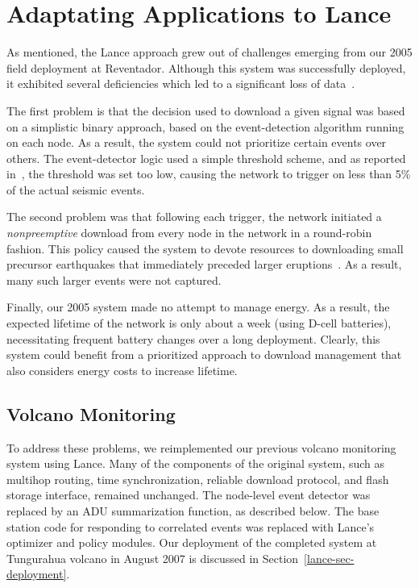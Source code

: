 \section{Adaptating Applications to Lance}
\label{lance-sec-adaptation}

As mentioned, the Lance approach grew out of challenges emerging from our
2005 field deployment at Reventador. Although this system was successfully
deployed, it exhibited several deficiencies which led to a significant loss
of data~\cite{volcano-osdi06}.

The first problem is that the decision used to download a given signal was
based on a simplistic binary approach, based on the event-detection algorithm
running on each node. As a result, the system could not prioritize certain
events over others. The event-detector logic used a simple threshold scheme,
and as reported in~\cite{volcano-osdi06}, the threshold was set too low,
causing the network to trigger on less than 5\% of the actual seismic events.

The second problem was that following each trigger, the network initiated a
\textit{nonpreemptive} download from every node in the network in a
round-robin fashion. This policy caused the system to devote resources to
downloading small precursor earthquakes that immediately preceded larger
eruptions~\cite{volcano-osdi06}. As a result, many such larger events were
not captured.

Finally, our 2005 system made no attempt to manage energy. As a result, the
expected lifetime of the network is only about a week (using D-cell
batteries), necessitating frequent battery changes over a long deployment.
Clearly, this system could benefit from a prioritized approach to download
management that also considers energy costs to increase lifetime.

\subsection{Volcano Monitoring}
\label{lance-subsec-volcano}

To address these problems, we reimplemented our previous volcano monitoring
system using Lance. Many of the components of the original system, such as
multihop routing, time synchronization, reliable download protocol, and flash
storage interface, remained unchanged. The node-level event detector was
replaced by an ADU summarization function, as described below. The base
station code for responding to correlated events was replaced with Lance's
optimizer and policy modules. Our deployment of the completed system at
Tungurahua volcano in August 2007 is discussed in
Section~\ref{lance-sec-deployment}.

